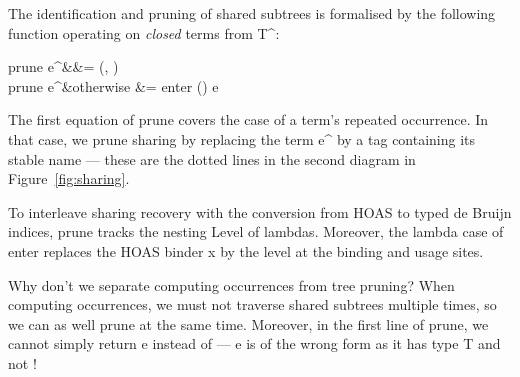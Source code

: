 The identification and pruning of shared subtrees is formalised by the following function operating on \emph{closed} terms from \<T^\tau\>:
%
\bgroup
{}
\begin{haskell}
  prune \ell \Omega e^\nu &\mid \nu\in\Omega &= (\nu\rhd\Omega, \underline\nu) \\
  prune \ell \Omega e^\nu &\mid otherwise    &= enter (\nu\rhd\Omega) e
\end{haskell}
\egroup
%
%
The first equation of \<prune\> covers the case of a term's repeated occurrence. In that case, we prune sharing by replacing the term \<e^\nu\> by a tag \<\underline\nu\> containing its stable name --- these are the dotted lines in the second diagram in Figure~\ref{fig:sharing}.

To interleave sharing recovery with the conversion from HOAS to typed de Bruijn indices, \<prune\> tracks the nesting \<Level\> of lambdas. Moreover, the lambda case of \<enter\> replaces the HOAS binder \<x\> by the level \<\ell\> at the binding and usage sites.

Why don't we separate computing occurrences from tree pruning? When computing occurrences, we must not traverse shared subtrees multiple times, so we can as well prune at the same time. Moreover, in the first line of \<prune\>, we cannot simply return \<e\> instead of \<\underline\nu\> --- \<e\> is of the wrong form as it has type \<T\> and not \<\cT\>! 

